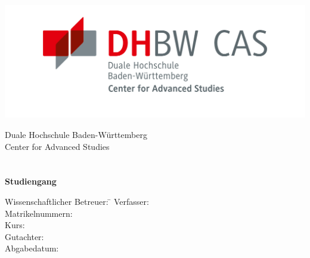 \begin{titlepage}
    \begin{center}
        \includegraphics{images/dhbw_logo}
        \vspace{2em}

        {\textsf{\large Duale Hochschule Baden-W\"urttemberg}}\\[1.5mm]
        {\textsf{\large Center for Advanced Studies}}\\[4em]

        {\textsf{\textbf{\large{\TheTypeOfWork}}}}\\[6mm]
        {\textsf{\textbf{\Large{}\TheTitle}}} \\[1.5cm]
        {\textsf{\textbf{\large{}Studiengang \TheFieldOfStudy}}\\[6mm]}

        \vfill

        \begin{minipage}{\textwidth}
            \begin{tabbing}
                Wissenschaftlicher Betreuer: \hspace{0.85cm}\=\kill
            Verfasser: \> \TheAuthor \\[1.5mm]
            Matrikelnummern: \> \TheMatriculationNumber \\[1.5mm]
            Kurs: \> \TheCourse \\[1.5mm]
            Gutachter: \> \TheCourseDirector \\[1.5mm]
            Abgabedatum: \> \TheSubmissionDate \\[1.5mm]
            \end{tabbing}
        \end{minipage}
    \end{center}
\end{titlepage}